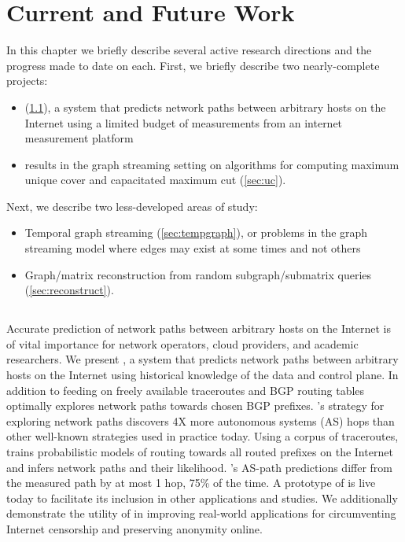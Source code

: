 \chapter{Current and Future Work}
\label{chap:futurework}

In this chapter we briefly describe several active research directions and the progress made to date on each.  First, we briefly describe two nearly-complete projects: 
\begin{itemize}
\item \sysname{} (\ref{sec:pc}), a system that predicts network paths between arbitrary hosts on the Internet using a limited budget of measurements from an internet measurement platform
\item results in the graph streaming setting on algorithms for computing maximum unique cover and capacitated maximum cut (\ref{sec:uc}).
\end{itemize}

Next, we describe two less-developed areas of study:

\begin{itemize}
\item Temporal graph streaming (\ref{sec:tempgraph}), or problems in the graph streaming model where edges may exist at some times and not others
\item Graph/matrix reconstruction from random subgraph/submatrix queries (\ref{sec:reconstruct}).
\end{itemize}

\section{\sysname}
\label{sec:pc}

Accurate prediction of network paths between arbitrary hosts on the Internet is of
vital importance for network operators, cloud providers, and academic researchers.
We present \sysname, a system that predicts network paths between arbitrary hosts on
the Internet using historical knowledge of the data and control plane. In addition to feeding on
freely available traceroutes and BGP routing tables \sysname{} optimally explores
network paths towards chosen BGP prefixes. \sysname's
strategy for exploring network paths discovers 4X more autonomous systems (AS) 
hops than other well-known strategies used in practice today.
Using a corpus of traceroutes, \sysname{} trains probabilistic models
of routing towards all routed prefixes on the Internet and 
infers network paths and their likelihood.
\sysname's AS-path predictions differ from the measured path by at most 1 hop, 75\% of the time.
A prototype of
\sysname is live today to facilitate its 
inclusion in other applications and studies.
We additionally demonstrate the utility of \sysname{} in improving
real-world applications for circumventing Internet censorship and preserving anonymity online.

